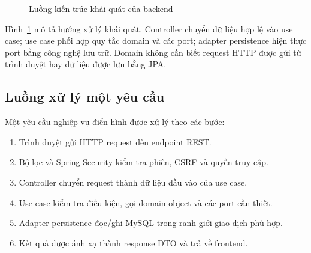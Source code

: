 \begin{figure}[htbp]
\centering
{}
\caption{Luồng kiến trúc khái quát của backend}
\label{fig:backend-architecture}
\end{figure}

Hình~\ref{fig:backend-architecture} mô tả hướng xử lý khái quát. Controller chuyển dữ liệu hợp lệ vào use case; use case phối hợp quy tắc domain và các port; adapter persistence hiện thực port bằng công nghệ lưu trữ. Domain không cần biết request HTTP được gửi từ trình duyệt hay dữ liệu được lưu bằng JPA.

\subsection{Luồng xử lý một yêu cầu}
Một yêu cầu nghiệp vụ điển hình được xử lý theo các bước:
\begin{enumerate}[label=\arabic*)]
    \item Trình duyệt gửi HTTP request đến endpoint REST.
    \item Bộ lọc và Spring Security kiểm tra phiên, CSRF và quyền truy cập.
    \item Controller chuyển request thành dữ liệu đầu vào của use case.
    \item Use case kiểm tra điều kiện, gọi domain object và các port cần thiết.
    \item Adapter persistence đọc/ghi MySQL trong ranh giới giao dịch phù hợp.
    \item Kết quả được ánh xạ thành response DTO và trả về frontend.
\end{enumerate}

